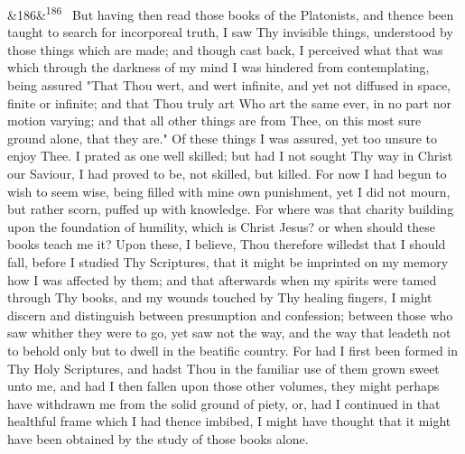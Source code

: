\documentclass[12pt]{article}
\newcommand{\para}[1][]{\par\noindent\ifx&#1&\else\textsuperscript{\footnotesize #1}~\fi}
\begin{document}
\para[186] But having then read those books of the Platonists, and thence been taught to search for incorporeal truth, I saw Thy invisible things, understood by those things which are made; and though cast back, I perceived what that was which through the darkness of my mind I was hindered from contemplating, being assured "That Thou wert, and wert infinite, and yet not diffused in space, finite or infinite; and that Thou truly art Who art the same ever, in no part nor motion varying; and that all other things are from Thee, on this most sure ground alone, that they are." Of these things I was assured, yet too unsure to enjoy Thee. I prated as one well skilled; but had I not sought Thy way in Christ our Saviour, I had proved to be, not skilled, but killed. For now I had begun to wish to seem wise, being filled with mine own punishment, yet I did not mourn, but rather scorn, puffed up with knowledge. For where was that charity building upon the foundation of humility, which is Christ Jesus? or when should these books teach me it? Upon these, I believe, Thou therefore willedst that I should fall, before I studied Thy Scriptures, that it might be imprinted on my memory how I was affected by them; and that afterwards when my spirits were tamed through Thy books, and my wounds touched by Thy healing fingers, I might discern and distinguish between presumption and confession; between those who saw whither they were to go, yet saw not the way, and the way that leadeth not to behold only but to dwell in the beatific country. For had I first been formed in Thy Holy Scriptures, and hadst Thou in the familiar use of them grown sweet unto me, and had I then fallen upon those other volumes, they might perhaps have withdrawn me from the solid ground of piety, or, had I continued in that healthful frame which I had thence imbibed, I might have thought that it might have been obtained by the study of those books alone.
\end{document}
